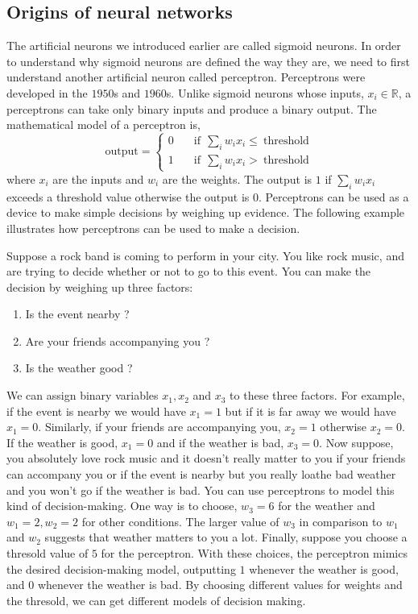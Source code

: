 \subsection{Origins of neural networks}
The artificial neurons we introduced earlier are called sigmoid neurons. In order to understand 
why sigmoid neurons are defined the way they are, we need to first understand another artificial 
neuron called perceptron. Perceptrons were developed in the $1950$s and $1960$s. Unlike sigmoid neurons 
whose inputs, $x_i \in \mathbb{R}$, a perceptrons can take only binary inputs and produce a binary output.
The mathematical model of a perceptron is,
\begin{equation*}
    \text{output} = 
     \begin{cases}
       0 &\quad \text{if} \ \ \sum_i w_i x_i \leq \ \text{threshold} \\
       1 &\quad  \text{if} \ \ \sum_i w_i x_i > \ \text{threshold} 
     \end{cases}
\end{equation*}
where $x_i$ are the inputs and $w_i$ are the weights. The output is $1$ if $\sum_i w_i x_i$ exceeds a threshold 
value otherwise the output is $0$. Perceptrons can be used as a device to make simple decisions by weighing up evidence. 
The following example illustrates how perceptrons can be used to make a decision.
\begin{boxedexample}
    Suppose a rock band is coming to perform in your city. You like rock music, and are trying to 
    decide whether or not to go to this event. You can make the decision by weighing up three factors:
   \begin{enumerate}
    \item Is the event nearby ?
    \item Are your friends accompanying you ?
    \item Is the weather good ?
   \end{enumerate}
   We can assign binary variables $x_1, x_2$ and $x_3$ to these three factors. For example, if the event is nearby we would
   have $x_1 =1$ but if it is far away we would have $x_1 = 0$. Similarly, if your friends are accompanying you, $x_2 =1$ otherwise $x_2 =0$.
   If the weather is good, $x_1 =0$ and if the weather is bad, $x_3 =0$. Now suppose, you absolutely love rock music and it doesn't really 
   matter to you if your friends can accompany you or if the event is nearby but you really loathe bad weather and you won't go if the
   weather is bad. You can use perceptrons to model this kind of decision-making. One way is to choose, $w_3 = 6$ for the weather and
   $w_1 =2, w_2 =2$ for other conditions. The larger value of $w_3$ in comparison to $w_1$ and $w_2$ suggests that weather matters to you a lot. 
   Finally, suppose you choose a thresold value of $5$ for the perceptron. With these choices, the perceptron mimics the desired 
   decision-making model, outputting $1$ whenever the weather is good, and $0$ whenever the weather is bad. By choosing different values for 
   weights and the thresold, we can get different models of decision making. 
\end{boxedexample}
